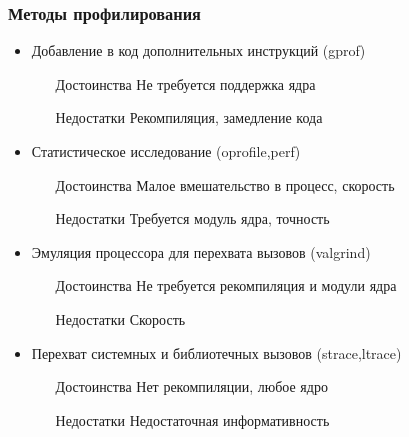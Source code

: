 \begin{frame}
  \frametitle{Методы профилирования}
  \begin{itemize}
    \item Добавление в код дополнительных инструкций (gprof)
      \begin{enumerate}
        \item[Достоинства] Не требуется поддержка ядра
        \item[Недостатки] Рекомпиляция, замедление кода
      \end{enumerate}
    \item Статистическое исследование (oprofile,perf)
      \begin{enumerate}
        \item[Достоинства] Малое вмешательство в процесс, скорость
        \item[Недостатки] Требуется модуль ядра, точность
      \end{enumerate}
    \item Эмуляция процессора для перехвата вызовов (valgrind)
       \begin{enumerate}
         \item[Достоинства] Не требуется рекомпиляция и модули ядра
         \item[Недостатки] Скорость
        \end{enumerate}
    \item Перехват системных и библиотечных вызовов (strace,ltrace)
       \begin{enumerate}
          \item[Достоинства] Нет рекомпиляции, любое ядро
          \item[Недостатки] Недостаточная информативность
       \end{enumerate}
  \end{itemize}
\end{frame}

